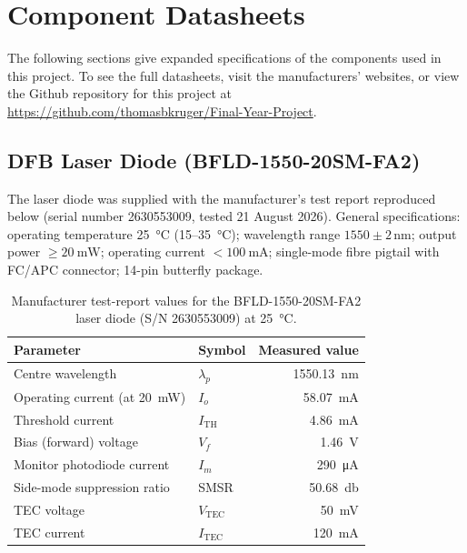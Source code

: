 \chapter{Component Datasheets}
\label{appendix:datasheets}
The following sections give expanded specifications of the components used in this project. To see the full datasheets, visit the manufacturers' websites, or view the Github repository for this project at \href{https://github.com/thomasbkruger/Final-Year-Project}{https://github.com/thomasbkruger/Final-Year-Project}. 

\label{appendix:driver}
\section{DFB Laser Diode (BFLD-1550-20SM-FA2)}
\label{appendix:laser}
The laser diode was supplied with the manufacturer's test report reproduced below (serial number 2630553009, tested 21 August 2026). General specifications: operating temperature \SI{25}{\celsius} (15--\SI{35}{\celsius}); wavelength range $1550 \pm 2$\,nm; output power $\geq \SI{20}{\milli\watt}$; operating current $< \SI{100}{\milli\ampere}$; single-mode fibre pigtail with FC/APC connector; 14-pin butterfly package.

\begin{table}[H]
	\centering
	\begin{tabular}{@{}llr@{}}
		\toprule
		\textbf{Parameter} & \textbf{Symbol} & \textbf{Measured value} \\
		\midrule
		Centre wavelength            & $\lambda_p$          & \SI{1550.13}{\nano\metre} \\
		Operating current (at \SI{20}{\milli\watt}) & $I_o$ & \SI{58.07}{\milli\ampere} \\
		Threshold current            & $I_{\mathrm{TH}}$    & \SI{4.86}{\milli\ampere} \\
		Bias (forward) voltage       & $V_f$                & \SI{1.46}{\volt} \\
		Monitor photodiode current   & $I_m$                & \SI{290}{\micro\ampere} \\
		Side-mode suppression ratio  & SMSR                 & \SI{50.68}{\decibel} \\
		TEC voltage                  & $V_{\mathrm{TEC}}$   & \SI{50}{\milli\volt} \\
		TEC current                  & $I_{\mathrm{TEC}}$   & \SI{120}{\milli\ampere} \\
		\bottomrule
	\end{tabular}
	\caption{Manufacturer test-report values for the BFLD-1550-20SM-FA2 laser diode (S/N 2630553009) at \SI{25}{\celsius}.}
	\label{tab:laser-testreport}
\end{table}

